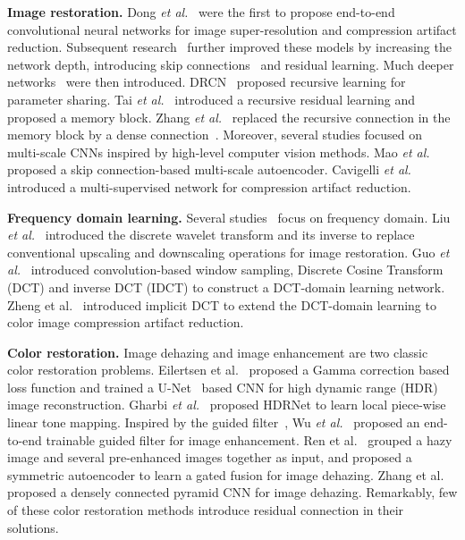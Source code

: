 \documentclass[10pt,twocolumn,letterpaper]{article}
\begin{document}
\textbf{Image restoration.} Dong \textit{et al.}~\cite{ARCNN,SRCNN} were the first to propose end-to-end convolutional neural networks for image super-resolution and compression artifact reduction. 
Subsequent research~\cite{Svoboda2016,vdsr,IRCNN} further improved these models by increasing the network depth, introducing skip connections~\cite{long2015fully} and residual learning. 
Much deeper networks~\cite{DRCN, DRRN, MemNet, RDN} were then introduced. DRCN~\cite{DRCN} proposed recursive learning for parameter sharing. Tai \textit{et al.}~\cite{DRRN,MemNet} introduced a recursive residual learning and proposed a memory block. Zhang \textit{et al.}~\cite{RDN} replaced the recursive connection in the memory block by a dense connection~\cite{DenseNet}. 
Moreover, several studies focused on multi-scale CNNs inspired by high-level computer vision methods. Mao \textit{et al.}~\cite{RED-Net} proposed a skip connection-based multi-scale autoencoder. 
Cavigelli \textit{et al.}~\cite{CAS-CNN} introduced a multi-supervised network for compression artifact reduction. 

\textbf{Frequency domain learning.} Several studies~\cite{MWCNN,DDCN,IDCN} focus on frequency domain. 
Liu \textit{et al.}~\cite{MWCNN} introduced the discrete wavelet transform and its inverse to replace conventional upscaling and downscaling operations for image restoration. 
Guo \textit{et al.}~\cite{DDCN} introduced convolution-based window sampling, Discrete Cosine Transform (DCT) and inverse DCT (IDCT) to construct a DCT-domain learning network. 
Zheng et al.~\cite{IDCN} introduced implicit DCT to extend the DCT-domain learning to color image compression artifact reduction.

\textbf{Color restoration.}  Image dehazing and image enhancement are two classic color restoration problems. 
Eilertsen et al.~\cite{HDRCNN} proposed a Gamma correction based loss function and trained a U-Net~\cite{UNet} based CNN for high dynamic range (HDR) image reconstruction. 
Gharbi \textit{et al.}~\cite{HDRNet} proposed HDRNet to learn local piece-wise linear tone mapping.  
Inspired by the guided filter~\cite{guidedfilter}, Wu \textit{et al.}~\cite{wu2018fast} proposed an end-to-end trainable guided filter for image enhancement. 
Ren et al.~\cite{ren2018gated} grouped a hazy image and several pre-enhanced images together as input, and proposed a symmetric autoencoder to learn a gated fusion for image dehazing.
Zhang et al.~\cite{zhang2018densely} proposed a densely connected pyramid CNN for image dehazing. 
Remarkably, few of these color restoration methods introduce residual connection in their solutions.
\end{document}
